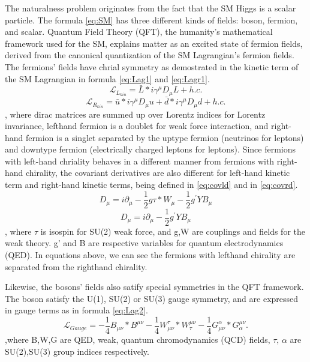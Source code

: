 The naturalness problem originates from the fact that the SM Higgs is a scalar particle.
The formula \ref{eq:SM} has three different kinds of fields: boson, fermion, and scalar.
Quantum Field Theory (QFT), the humanity's  mathematical framework used for the SM, explains matter as an excited state of fermion fields, derived from the canonical quantization of the SM Lagrangian's fermion fields.
The fermions' fields have chrial symmetry as demostrated in the kinetic term of the SM Lagrangian in formula \ref{eq:Lag1} and \ref{eq:Lagr1}.
\begin{equation}
\label{eq:Lag1}
	\mathcal{L}_{L_{kin}}  = \bar{L}*i\gamma^{\mu}D_{\mu}L+h.c.
\end{equation}
\begin{equation}
\label{eq:Lagr1}
	\mathcal{L}_{R_{kin}}  = \bar{u}*i\gamma^{\mu}D_{\mu}u+\bar{d}*i\gamma^{\mu}D_{\mu}d+h.c.
\end{equation}
, where dirac matrices are summed up over Lorentz indices for Lorentz invariance, lefthand fermion is a doublet for weak force interaction, and right-hand fermion is a singlet separated by the uptype fermion (neutrinos for leptons) and downtype fermion (electrically charged leptons for leptons). 
Since fermions with left-hand chriality behaves in a different manner from fermions with right-hand chirality, 
the covariant derivatives are also different for left-hand kinetic term and right-hand kinetic terms, being defined in \ref{eq:covld} and in \ref{eq:covrd}.
\begin{equation}
\label{eq:covld}
	D_{\mu}  = i\partial_{\mu}-\frac{1}{2}g\tau*W_{\mu}-\frac{1}{2}g^{'}YB_{\mu} 
\end{equation}
\begin{equation}
\label{eq:covrd}
	D_{\mu}  = i\partial_{\mu}-\frac{1}{2}g^{'}YB_{\mu} 
\end{equation}
, where $\tau$ is isospin for SU(2) weak force, and g,W are couplings and fields for the weak theory. g' and B are respective variables for quantum electrodynamics (QED). 
In equations above, we can see the fermions with lefthand chirality are separated from the righthand chirality.


Likewise, the bosons' fields also satify special symmetries in the QFT framework.
The boson satisfy the U(1), SU(2) or SU(3) gauge symmetry, and are expressed in gauge terms as in formula \ref{eq:Lag2}.
\begin{equation}
\label{eq:Lag2}
	\mathcal{L}_{Gauge} = -\frac{1}{4}B_{\mu\nu}*B^{\mu\nu}-\frac{1}{4}W_{\mu\nu}^{\tau}*W^{\mu\nu}_{\tau}-\frac{1}{4}G_{\mu\nu}^{\alpha}*G^{\mu\nu}_{\alpha}.
\end{equation}
,where B,W,G are QED, weak, quantum chromodynamics (QCD) fields, $\tau$, $\alpha$ are SU(2),SU(3) group indices respectively. 

